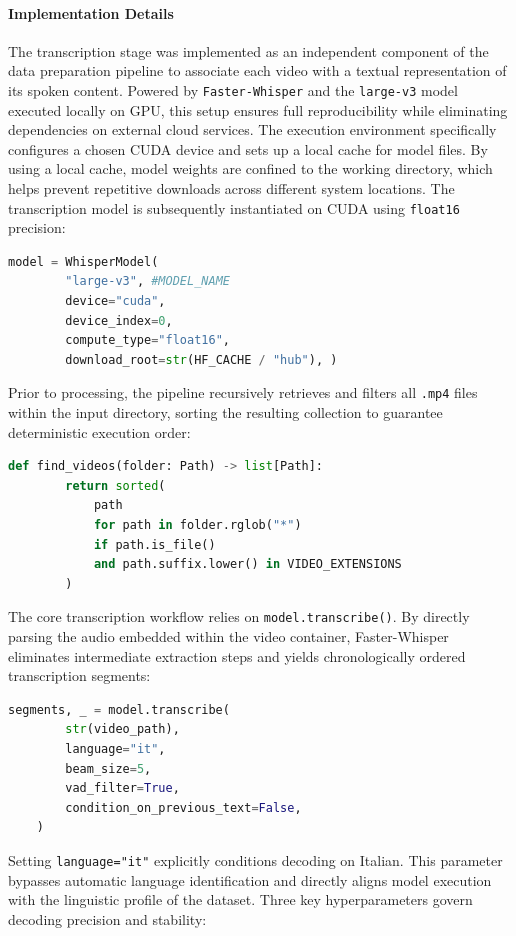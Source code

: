 \paragraph{Implementation Details}
The transcription stage was implemented as an independent component of the data preparation pipeline to associate each video with a textual representation of its spoken content. Powered by \texttt{Faster-Whisper} and the \texttt{large-v3} model executed locally on GPU, this setup ensures full reproducibility while eliminating dependencies on external cloud services.
The execution environment specifically configures a chosen CUDA device and sets up a local cache for model files. By using a local cache, model weights are confined to the working directory, which helps prevent repetitive downloads across different system locations.
The transcription model is subsequently instantiated on CUDA using \texttt{float16} precision:
\begin{lstlisting}[language=Python]
    model = WhisperModel(
        "large-v3", #MODEL_NAME
        device="cuda",
        device_index=0,
        compute_type="float16",
        download_root=str(HF_CACHE / "hub"), )
\end{lstlisting}
Prior to processing, the pipeline recursively retrieves and filters all \texttt{.mp4} files within the input directory, sorting the resulting collection to guarantee deterministic execution order:
\begin{lstlisting}[language=Python]
    def find_videos(folder: Path) -> list[Path]:
        return sorted(
            path
            for path in folder.rglob("*")
            if path.is_file()
            and path.suffix.lower() in VIDEO_EXTENSIONS
        )
\end{lstlisting}
The core transcription workflow relies on \texttt{model.transcribe()}. By directly parsing the audio embedded within the video container, Faster-Whisper eliminates intermediate extraction steps and yields chronologically ordered transcription segments:
\begin{lstlisting}[language=Python]
    segments, _ = model.transcribe(
        str(video_path),
        language="it",
        beam_size=5,
        vad_filter=True,
        condition_on_previous_text=False,
    )
\end{lstlisting}
Setting \texttt{language="it"} explicitly conditions decoding on Italian. This parameter bypasses automatic language identification and directly aligns model execution with the linguistic profile of the dataset.
Three key hyperparameters govern decoding precision and stability:
